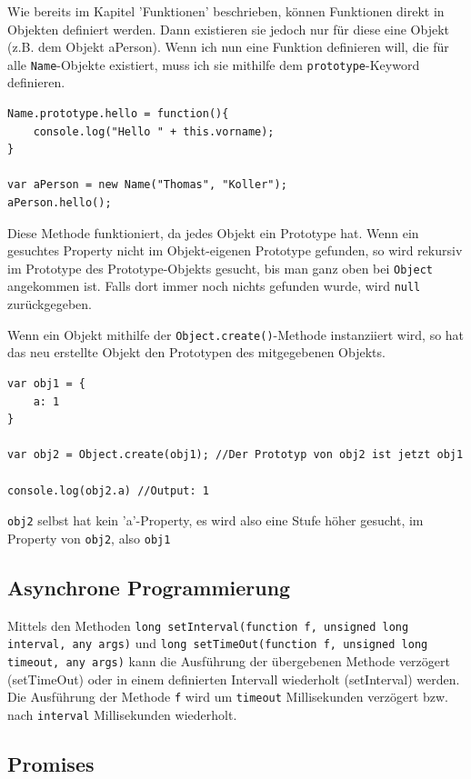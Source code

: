 \documentclass[a4paper, 11pt]{article}
\newcommand{\code}[1]{\texttt{#1}}
\begin{document}
\noindent Wie bereits im Kapitel 'Funktionen' beschrieben, können Funktionen direkt in Objekten definiert werden. Dann existieren sie jedoch nur für diese eine Objekt (z.B. dem Objekt aPerson). Wenn ich nun eine Funktion definieren will, die für alle \code{Name}-Objekte existiert, muss ich sie mithilfe dem \code{prototype}-Keyword definieren.

\begin{lstlisting}
Name.prototype.hello = function(){
	console.log("Hello " + this.vorname); 
}

var aPerson = new Name("Thomas", "Koller");
aPerson.hello();
\end{lstlisting}

Diese Methode funktioniert, da jedes Objekt ein Prototype hat. Wenn ein gesuchtes Property nicht im Objekt-eigenen Prototype gefunden, so wird rekursiv im Prototype des Prototype-Objekts gesucht, bis man ganz oben bei \code{Object} angekommen ist. Falls dort immer noch nichts gefunden wurde, wird \code{null} zurückgegeben. 

Wenn ein Objekt mithilfe der \code{Object.create()}-Methode instanziiert wird, so hat das neu erstellte Objekt den Prototypen des mitgegebenen Objekts.

\begin{lstlisting}
var obj1 = {
	a: 1
}

var obj2 = Object.create(obj1); //Der Prototyp von obj2 ist jetzt obj1

console.log(obj2.a) //Output: 1
\end{lstlisting}

\code{obj2} selbst hat kein 'a'-Property, es wird also eine Stufe höher gesucht, im Property von \code{obj2}, also \code{obj1}


\subsection{Asynchrone Programmierung}
Mittels den Methoden \code{long setInterval(function f, unsigned long interval, any args)} und \code{long setTimeOut(function f, unsigned long timeout, any args)} kann die Ausführung der übergebenen Methode verzögert (setTimeOut) oder in einem definierten Intervall wiederholt (setInterval) werden. Die Ausführung der Methode \code{f} wird um \code{timeout} Millisekunden verzögert bzw. nach \code{interval} Millisekunden wiederholt.

\subsection{Promises}
\end{document}
